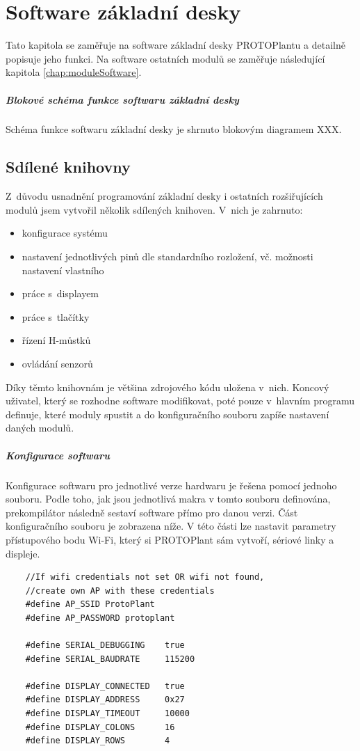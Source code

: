 \chapter{Software základní desky}
Tato kapitola se zaměřuje na software základní desky PROTOPlantu a detailně popisuje jeho funkci.
Na software ostatních modulů se zaměřuje následující kapitola \ref{chap:moduleSoftware}.

\paragraph{Blokové schéma funkce softwaru základní desky}
Schéma funkce softwaru základní desky je shrnuto blokovým diagramem XXX.

\section{Sdílené knihovny}
Z~důvodu usnadnění programování základní desky i ostatních rozšiřujících modulů jsem vytvořil několik sdílených knihoven. 
V~nich je zahrnuto:
\begin{itemize}
    \item konfigurace systému
    \item nastavení jednotlivých pinů dle standardního rozložení, vč. možnosti nastavení vlastního
    \item práce s~displayem
    \item práce s~tlačítky
    \item řízení H-můstků
    \item ovládání senzorů
\end{itemize}
Díky těmto knihovnám je většina zdrojového kódu uložena v~nich. 
Koncový uživatel, který se rozhodne software modifikovat, poté pouze v~hlavním programu definuje, které moduly spustit a do konfiguračního souboru zapíše nastavení daných modulů.

\paragraph{Konfigurace softwaru}
Konfigurace softwaru pro jednotlivé verze hardwaru je řešena pomocí jednoho souboru.
Podle toho, jak jsou jednotlivá makra v tomto souboru definována, prekompilátor následně sestaví software přímo pro danou verzi.
Část konfiguračního souboru je zobrazena níže.
V této části lze nastavit parametry přístupového bodu Wi-Fi, který si PROTOPlant sám vytvoří, sériové linky a displeje.
\begin{lstlisting}
    //If wifi credentials not set OR wifi not found, 
    //create own AP with these credentials
    #define AP_SSID ProtoPlant
    #define AP_PASSWORD protoplant
    
    #define SERIAL_DEBUGGING    true
    #define SERIAL_BAUDRATE     115200
    
    #define DISPLAY_CONNECTED   true
    #define DISPLAY_ADDRESS     0x27
    #define DISPLAY_TIMEOUT     10000
    #define DISPLAY_COLONS      16
    #define DISPLAY_ROWS        4
\end{lstlisting}


